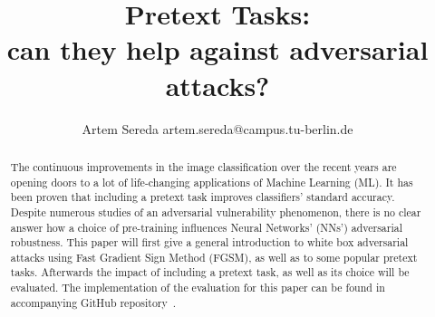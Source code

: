 \documentclass[12pt]{extarticle}
\title{
    Pretext Tasks: \\
    can they help against adversarial attacks?
}
\author{Artem Sereda artem.sereda@campus.tu-berlin.de}
\begin{document}
    \maketitle

    \begin{abstract}
    The continuous improvements in the image classification over the recent years are opening doors to
    a lot of life-changing applications of Machine Learning (ML).
    It has been proven that including a pretext task improves classifiers' standard accuracy.
    Despite numerous studies of an adversarial vulnerability phenomenon, there is no clear answer
    how a choice of pre-training influences Neural Networks' (NNs') adversarial robustness.
    This paper will first give a general introduction to white box adversarial attacks using Fast Gradient Sign Method (FGSM),
    as well as to some popular pretext tasks.
    Afterwards the impact of including a pretext task, as well as its choice will be evaluated.
    The implementation of the evaluation for this paper can be found in accompanying GitHub repository~\cite{github}.
    \end{abstract}


    
    
    


    \printbibliography
\end{document}
